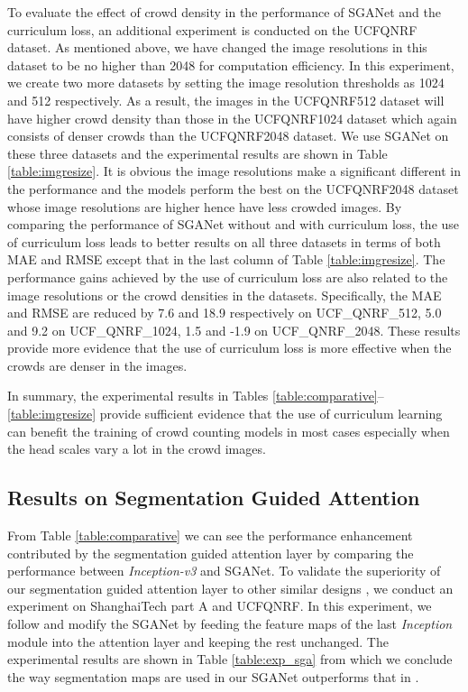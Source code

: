 \documentclass[journal,comsoc]{IEEEtran}
\begin{document}
To evaluate the effect of crowd density in the performance of SGANet and the curriculum loss, an additional experiment is conducted on the UCFQNRF dataset. As mentioned above, we have changed the image resolutions in this dataset to be no higher than 2048 for computation efficiency. In this experiment, we create two more datasets by setting the image resolution thresholds as 1024 and 512 respectively. As a result, the images in the UCFQNRF512 dataset will have higher crowd density than those in the UCFQNRF1024 dataset which again consists of denser crowds than the UCFQNRF2048 dataset. We use SGANet on these three datasets and the experimental results are shown in Table \ref{table:imgresize}. It is obvious the image resolutions make a significant different in the performance and the models perform the best on the UCFQNRF2048 dataset whose image resolutions are higher hence have less crowded images. By comparing the performance of SGANet without and with curriculum loss, the use of curriculum loss leads to better results on all three datasets in terms of both MAE and RMSE except that in the last column of Table \ref{table:imgresize}. The performance gains achieved by the use of curriculum loss are also related to the image resolutions or the crowd densities in the datasets. 
Specifically, the MAE and RMSE are reduced by 7.6 and 18.9 respectively on UCF\_QNRF\_512, 5.0 and 9.2 on UCF\_QNRF\_1024, 1.5 and -1.9 on UCF\_QNRF\_2048. These results provide more evidence that the use of curriculum loss is more effective when the crowds are denser in the images.

In summary, the experimental results in Tables \ref{table:comparative}--\ref{table:imgresize} provide sufficient evidence that the use of curriculum learning can benefit the training of crowd counting models in most cases especially when the head scales vary a lot in the crowd images.

\subsection{Results on Segmentation Guided Attention}\label{sec:exp_sga}

From Table \ref{table:comparative} we can see the performance enhancement contributed by the segmentation guided attention layer by comparing the performance between \textit{Inception-v3} and SGANet. To validate the superiority of our segmentation guided attention layer to other similar designs \cite{shi2019counting}, we conduct an experiment on ShanghaiTech part A and UCFQNRF. In this experiment, we follow \cite{shi2019counting} and modify the SGANet by feeding the feature maps of the last \textit{Inception} module into the attention layer and keeping the rest unchanged. The experimental results are shown in Table \ref{table:exp_sga} from which we conclude the way segmentation maps are used in our SGANet outperforms that in \cite{shi2019counting}.
\end{document}
